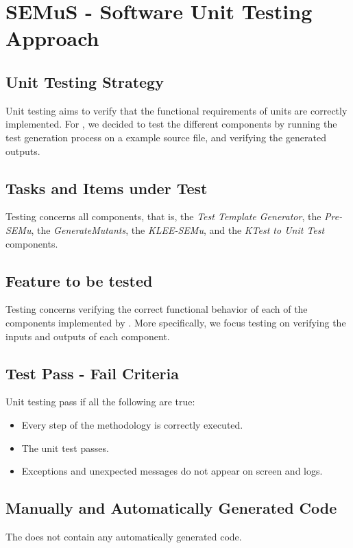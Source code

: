 
\chapter{SEMuS - Software Unit Testing Approach}


\section{Unit Testing Strategy}

Unit testing aims to verify that the functional requirements of \SEMUS units are correctly implemented. For \SEMUS, we decided to test the different components by running the test generation process on a example source file, and verifying the generated outputs.

\section{Tasks and Items under Test}

Testing concerns all \SEMUS components, that is, the \emph{Test Template Generator}, the \emph{Pre-SEMu}, the \emph{GenerateMutants}, the \emph{KLEE-SEMu}, and the \emph{KTest to Unit Test} components.

\section{Feature to be tested}

Testing concerns verifying the correct functional behavior of each of the components implemented by \SEMUS. More specifically, we focus testing on verifying the inputs and outputs of each component.

\section{Test Pass - Fail Criteria}

Unit testing pass if all the following are true:
\begin{itemize}
	\item Every step of the methodology is correctly executed.
	\item The unit test passes.
	\item Exceptions and unexpected messages do not appear on screen and logs.
\end{itemize}


\section{Manually and Automatically Generated Code}

The \SEMUS does not contain any automatically generated code.
